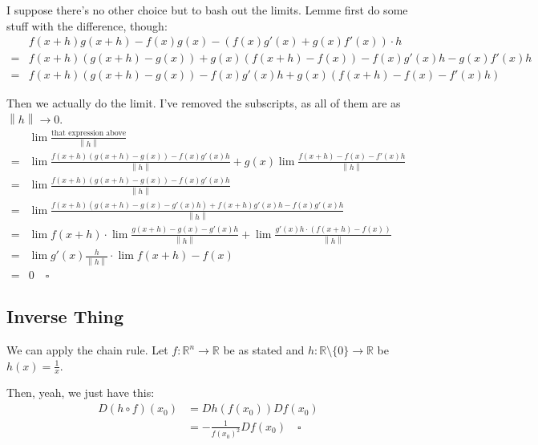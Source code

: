 \documentclass[12pt]{article}
\newcommand{\R}{\mathbb{R}}
\newcommand{\norm}[1]{\left\lVert#1\right\rVert}
\begin{document}
I suppose there's no other choice but to bash out the limits.
Lemme first do some stuff with the difference, though:
\begin{align*}
      & f(x+h)g(x+h)-f(x)g(x)-(f(x)g'(x)+g(x)f'(x)) \cdot h         \\
  ={} & f(x+h)(g(x+h)-g(x))+g(x)(f(x+h)-f(x))-f(x)g'(x)h-g(x)f'(x)h \\
  ={} & f(x+h)(g(x+h)-g(x))-f(x)g'(x)h+g(x)(f(x+h)-f(x)-f'(x)h)
\end{align*}

Then we actually do the limit.
I've removed the subscripts, as all of them are as $\norm{h} \to 0$.
\begin{align*}
      & \lim \frac{\text{that expression above}}{\norm{h}}                       \\
  ={} & \lim \frac{f(x+h)(g(x+h)-g(x))-f(x)g'(x)h}{\norm{h}}
  + g(x)\lim \frac{f(x+h)-f(x)-f'(x)h}{\norm{h}}                                 \\
  ={} & \lim \frac{f(x+h)(g(x+h)-g(x))-f(x)g'(x)h}{\norm{h}}                     \\
  ={} & \lim \frac{f(x+h)(g(x+h)-g(x)-g'(x)h)+f(x+h)g'(x)h-f(x)g'(x)h}{\norm{h}} \\
  ={} & \lim f(x+h) \cdot \lim \frac{g(x+h)-g(x)-g'(x)h}{\norm{h}}
  + \lim \frac{g'(x)h \cdot (f(x+h)-f(x))}{\norm{h}}                             \\
  ={} & \lim g'(x)\frac{h}{\norm{h}} \cdot \lim f(x+h)-f(x)               \\
  ={} & 0\quad\square
\end{align*}

\subsection{Inverse Thing}

We can apply the chain rule.
Let $f: \R^n \to \R$ be as stated and $h: \R \setminus \{0\} \to \R$ be $h(x)=\frac{1}{x}$.

Then, yeah, we just have this:
\begin{align*}
  D(h \circ f)(x_0)
   & = Dh(f(x_0))Df(x_0)                      \\
   & = -\frac{1}{f(x_0)^2}Df(x_0)\quad\square
\end{align*}
\end{document}
